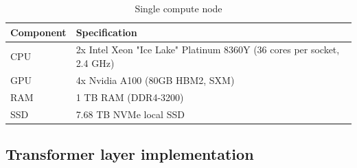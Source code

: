 \begin{table}[H]
    \centering
    \begin{tabularx}{0.90\textwidth}{|X|X|}
    \hline
    \textbf{Component} & \textbf{Specification} \\ \hline
    CPU & 2x Intel Xeon "Ice Lake" Platinum 8360Y (36 cores per socket, 2.4 GHz) \\ \hline
    GPU & 4x Nvidia A100 (80GB HBM2, SXM) \\ \hline
    RAM & 1 TB RAM (DDR4-3200) \\ \hline
    SSD & 7.68 TB NVMe local SSD \\ \hline
    \end{tabularx}
    \caption{Single compute node}
    \label{table:server_setup}
\end{table}

\newpage

\subsection{Transformer layer implementation}
\label{sec:transformer_layer_Python}

